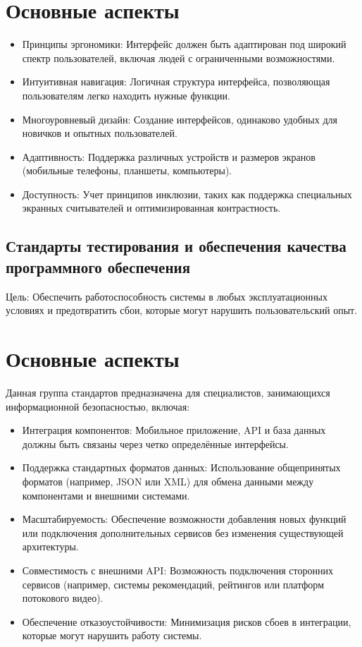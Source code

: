 \section*{Основные аспекты}
\begin{itemize}
    \item Принципы эргономики: Интерфейс должен быть адаптирован под широкий спектр пользователей, включая людей с ограниченными возможностями.
    \item Интуитивная навигация: Логичная структура интерфейса, позволяющая пользователям легко находить нужные функции.
    \item Многоуровневый дизайн: Создание интерфейсов, одинаково удобных для новичков и опытных пользователей.
    \item Адаптивность: Поддержка различных устройств и размеров экранов (мобильные телефоны, планшеты, компьютеры).
    \item Доступность: Учет принципов инклюзии, таких как поддержка специальных экранных считывателей и оптимизированная контрастность.
\end{itemize}

\subsection{Стандарты тестирования и обеспечения качества программного обеспечения}

Цель: Обеспечить работоспособность системы в любых эксплуатационных условиях и предотвратить сбои, которые могут нарушить пользовательский опыт.
\section*{Основные аспекты}
Данная группа стандартов предназначена для специалистов, занимающихся информационной безопасностью, включая:
\begin{itemize}
    \item Интеграция компонентов: Мобильное приложение, API и база данных должны быть связаны через четко определённые интерфейсы.
    \item Поддержка стандартных форматов данных: Использование общепринятых форматов (например, JSON или XML) для обмена данными между компонентами и внешними системами.
    \item Масштабируемость: Обеспечение возможности добавления новых функций или подключения дополнительных сервисов без изменения существующей архитектуры.
    \item Совместимость с внешними API: Возможность подключения сторонних сервисов (например, системы рекомендаций, рейтингов или платформ потокового видео).
    \item Обеспечение отказоустойчивости: Минимизация рисков сбоев в интеграции, которые могут нарушить работу системы.
\end{itemize}

